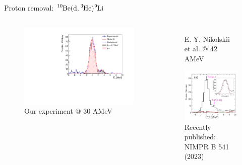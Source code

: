 \documentclass[sans,
frameno, %
mp,
usenames,dvipsnames, %
onlytextwidth, %
t,%
11pt]{beamer}
\newcommand{\iso}[2]{\ce{^{#1}#2}}
\begin{document}
\begin{frame}{Proton removal: $\iso{10}{Be}(\textrm{d}, \iso{3}{He})\iso{9}{Li}$}
    \begin{columns}[t]
        {
            \begin{figure}
                \captionsetup{belowskip=-8pt}
                \centering
                \caption{Our experiment @ \qty{30}{} AMeV}
                \includegraphics[width=\linewidth, cfbox=myorange 1pt 0pt 0pt]{figures/Workshop/10Be_d3He_ex.pdf}
            \end{figure}
        }
        \hfill
        {
            \begin{figure}
                \centering
                \captionsetup{belowskip=2pt}
                \caption{E. Y. Nikolskii et al. @ 42 AMeV}
                \includegraphics[height=0.41\textheight, cfbox=Mulberry 1pt 1pt]{figures/acculina_new.png}
                \caption{Recently published: NIMPR B 541 (2023)}
            \end{figure}
        }
    \end{columns}


\end{frame}
\end{document}
